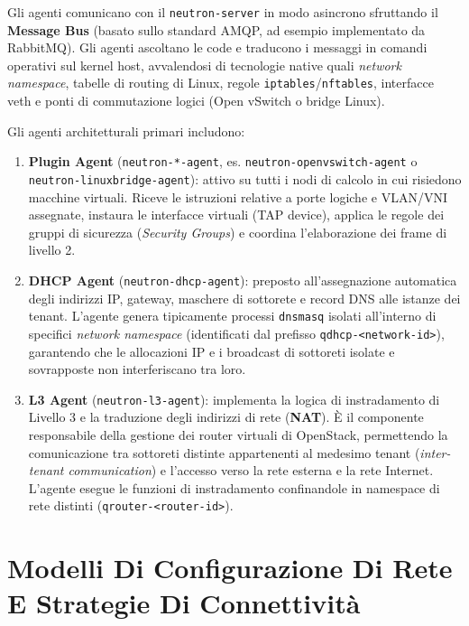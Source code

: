 \documentclass[11pt, a4paper]{article}
\begin{document}
Gli agenti comunicano con il \texttt{neutron-server} in modo asincrono sfruttando il \textbf{Message Bus} (basato sullo standard AMQP, ad esempio implementato da RabbitMQ). Gli agenti ascoltano le code e traducono i messaggi in comandi operativi sul kernel host, avvalendosi di tecnologie native quali \emph{network namespace}, tabelle di routing di Linux, regole \texttt{iptables}/\texttt{nftables}, interfacce veth e ponti di commutazione logici (Open vSwitch o bridge Linux).

Gli agenti architetturali primari includono:
\begin{enumerate}
    \item \textbf{Plugin Agent} (\texttt{neutron-*-agent}, es. \texttt{neutron-openvswitch-agent} o \texttt{neutron-linuxbridge-agent}): attivo su tutti i nodi di calcolo in cui risiedono macchine virtuali. Riceve le istruzioni relative a porte logiche e VLAN/VNI assegnate, instaura le interfacce virtuali (TAP device), applica le regole dei gruppi di sicurezza (\emph{Security Groups}) e coordina l'elaborazione dei frame di livello 2.
    \item \textbf{DHCP Agent} (\texttt{neutron-dhcp-agent}): preposto all'assegnazione automatica degli indirizzi IP, gateway, maschere di sottorete e record DNS alle istanze dei tenant. L'agente genera tipicamente processi \texttt{dnsmasq} isolati all'interno di specifici \emph{network namespace} (identificati dal prefisso \texttt{qdhcp-<network-id>}), garantendo che le allocazioni IP e i broadcast di sottoreti isolate e sovrapposte non interferiscano tra loro.
    \item \textbf{L3 Agent} (\texttt{neutron-l3-agent}): implementa la logica di instradamento di Livello 3 e la traduzione degli indirizzi di rete (\textbf{NAT}). È il componente responsabile della gestione dei router virtuali di OpenStack, permettendo la comunicazione tra sottoreti distinte appartenenti al medesimo tenant (\emph{inter-tenant communication}) e l'accesso verso la rete esterna e la rete Internet. L'agente esegue le funzioni di instradamento confinandole in namespace di rete distinti (\texttt{qrouter-<router-id>}).
\end{enumerate}

\newpage

\section{Modelli Di Configurazione Di Rete E Strategie Di Connettività}
\end{document}
